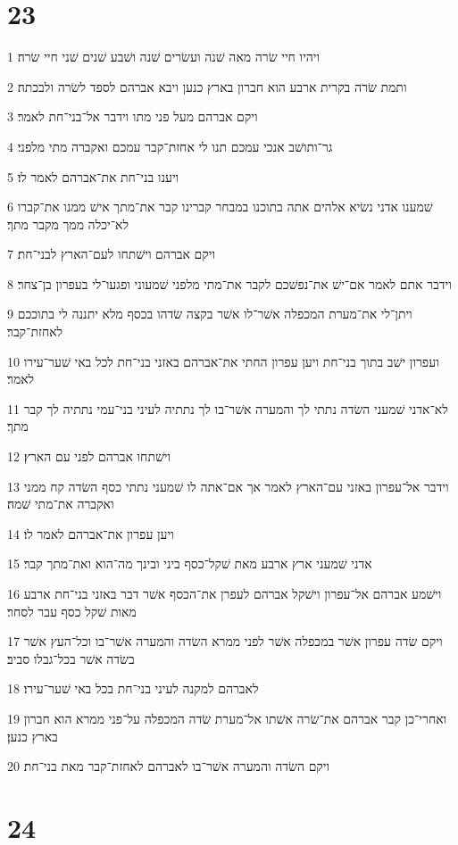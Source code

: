 \chapter{23}

\par 1 ויהיו חיי שׂרה מאה שׁנה ועשׂרים שׁנה ושׁבע שׁנים שׁני חיי שׂרה׃
\par 2 ותמת שׂרה בקרית ארבע הוא חברון בארץ כנען ויבא אברהם לספד לשׂרה ולבכתה׃
\par 3 ויקם אברהם מעל פני מתו וידבר אל־בני־חת לאמר׃
\par 4 גר־ותושׁב אנכי עמכם תנו לי אחזת־קבר עמכם ואקברה מתי מלפני׃
\par 5 ויענו בני־חת את־אברהם לאמר לו׃
\par 6 שׁמענו אדני נשׂיא אלהים אתה בתוכנו במבחר קברינו קבר את־מתך אישׁ ממנו את־קברו לא־יכלה ממך מקבר מתך׃
\par 7 ויקם אברהם וישׁתחו לעם־הארץ לבני־חת׃
\par 8 וידבר אתם לאמר אם־ישׁ את־נפשׁכם לקבר את־מתי מלפני שׁמעוני ופגעו־לי בעפרון בן־צחר׃
\par 9 ויתן־לי את־מערת המכפלה אשׁר־לו אשׁר בקצה שׂדהו בכסף מלא יתננה לי בתוככם לאחזת־קבר׃
\par 10 ועפרון ישׁב בתוך בני־חת ויען עפרון החתי את־אברהם באזני בני־חת לכל באי שׁער־עירו לאמר׃
\par 11 לא־אדני שׁמעני השׂדה נתתי לך והמערה אשׁר־בו לך נתתיה לעיני בני־עמי נתתיה לך קבר מתך׃
\par 12 וישׁתחו אברהם לפני עם הארץ׃
\par 13 וידבר אל־עפרון באזני עם־הארץ לאמר אך אם־אתה לו שׁמעני נתתי כסף השׂדה קח ממני ואקברה את־מתי שׁמה׃
\par 14 ויען עפרון את־אברהם לאמר לו׃
\par 15 אדני שׁמעני ארץ ארבע מאת שׁקל־כסף ביני ובינך מה־הוא ואת־מתך קבר׃
\par 16 וישׁמע אברהם אל־עפרון וישׁקל אברהם לעפרן את־הכסף אשׁר דבר באזני בני־חת ארבע מאות שׁקל כסף עבר לסחר׃
\par 17 ויקם שׂדה עפרון אשׁר במכפלה אשׁר לפני ממרא השׂדה והמערה אשׁר־בו וכל־העץ אשׁר בשׂדה אשׁר בכל־גבלו סביב׃
\par 18 לאברהם למקנה לעיני בני־חת בכל באי שׁער־עירו׃
\par 19 ואחרי־כן קבר אברהם את־שׂרה אשׁתו אל־מערת שׂדה המכפלה על־פני ממרא הוא חברון בארץ כנען׃
\par 20 ויקם השׂדה והמערה אשׁר־בו לאברהם לאחזת־קבר מאת בני־חת׃

\chapter{24}

